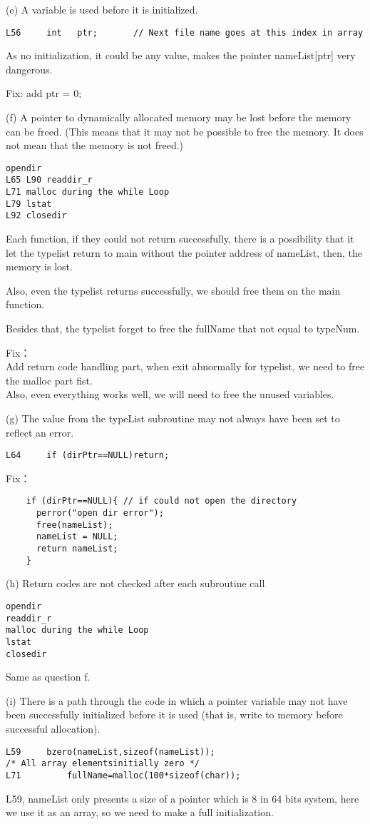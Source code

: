 \documentclass[12pt]{article}
\begin{document}
(e) A variable is used before it is initialized. 
\begin{lstlisting}
L56     int   ptr;       // Next file name goes at this index in array 
\end{lstlisting}
As no initialization, it could be any value, makes the pointer
nameList[ptr] very dangerous.

Fix: add ptr = 0;

(f) A pointer to dynamically allocated memory may be lost before the
memory can be freed. (This means that it may not be possible to free
the memory. It does not mean that the memory is not freed.)  
\begin{lstlisting}
opendir
L65 L90 readdir_r
L71 malloc during the while Loop
L79 lstat
L92 closedir
\end{lstlisting}
Each function, if they could not return successfully, there is a
possibility that it let the typelist return to main without the pointer
address of nameList, then, the memory is lost.

Also, even the typelist returns successfully, we should free them on
the main function.

Besides that, the typelist forget to free the fullName that not equal
to typeNum.

Fix：\\
Add return code handling part, when exit abnormally for typelist, we
need to free the malloc part fist.\\
Also, even everything works well, we will need to free the unused
variables. 



(g) The value from the typeList subroutine may not always have been
set to reflect an error. 
\begin{lstlisting}
L64     if (dirPtr==NULL)return;
\end{lstlisting}
Fix： 
\begin{lstlisting}
    if (dirPtr==NULL){ // if could not open the directory
      perror("open dir error");
      free(nameList);
      nameList = NULL;
      return nameList; 
    } 
\end{lstlisting}


(h) Return codes are not checked after each subroutine call
\begin{lstlisting}
opendir
readdir_r
malloc during the while Loop
lstat
closedir
\end{lstlisting}
Same as question f.


(i) There is a path through the code in which a pointer variable may
not have been successfully initialized before it is used (that is,
write to memory before successful allocation). 
\begin{lstlisting}
L59     bzero(nameList,sizeof(nameList));       
/* All array elementsinitially zero */ 
L71         fullName=malloc(100*sizeof(char));
\end{lstlisting}
L59, nameList only presents a size of a pointer which is 8 in 64 bits
system, here we use it as an array, so we need to make a full
initialization.
\end{document}

